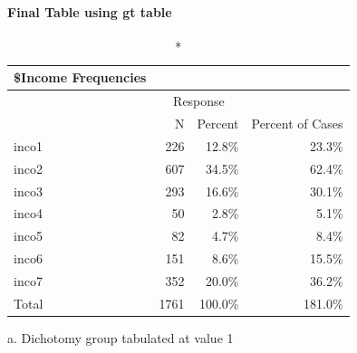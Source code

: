 \documentclass[
]{article}
\newenvironment{Shaded}{}{}
\newcommand{\AttributeTok}[1]{#1}
\newcommand{\ConstantTok}[1]{\textcolor[rgb]{0.35,0.36,0.96}{#1}}
\newcommand{\FunctionTok}[1]{#1}
\newcommand{\NormalTok}[1]{#1}
\newcommand{\SpecialCharTok}[1]{\textcolor[rgb]{0.00,0.50,0.50}{#1}}
\newcommand{\StringTok}[1]{\textcolor[rgb]{0.01,0.42,0.03}{#1}}
\begin{document}
\hypertarget{final-table-using-gt-table}{%
\paragraph{\texorpdfstring{\textbf{Final Table using gt
table}}{Final Table using gt table}}\label{final-table-using-gt-table}}

\begin{Shaded}
\end{Shaded}

\setlength{\LTpost}{0mm}
\begin{longtable}{l|rrr}
\caption*{
{\large \$Income Frequencies}
} \\ 
\toprule
\multicolumn{1}{l}{} & \multicolumn{2}{c}{Response} &  \\ 
\cmidrule(lr){2-3}
\multicolumn{1}{l}{} & N & Percent & Percent of Cases \\ 
\midrule\addlinespace[2.5pt]
inco1 & 226 & 12.8\% & 23.3\% \\ 
inco2 & 607 & 34.5\% & 62.4\% \\ 
inco3 & 293 & 16.6\% & 30.1\% \\ 
inco4 & 50 & 2.8\% & 5.1\% \\ 
inco5 & 82 & 4.7\% & 8.4\% \\ 
inco6 & 151 & 8.6\% & 15.5\% \\ 
inco7 & 352 & 20.0\% & 36.2\% \\ 
Total & 1761 & 100.0\% & 181.0\% \\ 
\bottomrule
\end{longtable}
\begin{minipage}{\linewidth}
a. Dichotomy group tabulated at value 1\\
\end{minipage}
\end{document}
